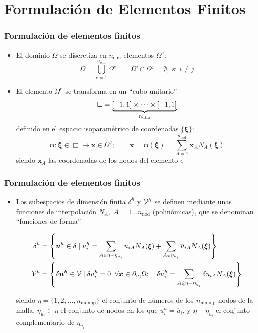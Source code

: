 \documentclass[handout]{beamer}
\begin{document}
\section{Formulación de Elementos Finitos}
\begin{frame}
\frametitle{Formulación de elementos finitos}
\begin{itemize}
\item El dominio $\Omega$ se discretiza en $n_{\textrm{elm}}$ elementos
$\Omega^e$:
\begin{equation}
\Omega=\bigcup_{e=1}^{n_{\textrm{elm}}} \Omega^e \qquad \Omega^i \cap \Omega^j=
\emptyset,\textrm{ si } i\neq j
\end{equation}
\item El elemento $\Omega^e$ se transforma
en un ``cubo unitario''
$$\Box=\underbrace{[-1,1]\times \cdots \times [-1,1]}_{n_{\rm dim}}$$
definido en el espacio isoparamétrico de coordenadas $\{ \bm{\xi} \}$:
\begin{equation}
\bm{\phi}:\bm{\xi}\in \Box \rightarrow \bm{x} \in \Omega^e; \qquad
\bm{x}=\bm{\phi}(\bm{\xi})=\sum_{A=1}^{n^{e}_{\textrm{nod}}}
\bm{x}_{A} N_{A}(\bm{\xi}) \label{mapiso}
\end{equation}
siendo $\bm{x}_A$ las coordenadas de los nodos
del elemento $e$
\end{itemize}
\end{frame}
\begin{frame}
\frametitle{Formulación de elementos finitos}
\begin{itemize}
\item Los subespacios de dimensión finita $\delta^h$ y ${\cal V}^h$
se definen mediante unas funciones de interpolación $N_A, \;
A=1 \ldots n_{\textrm{nod}}$ (polinómicas), que se denominan ``funciones de forma''
\begin{small}
\begin{align*}
\delta^h&=\left\{
\bm{u}^{h} \in \delta \mid
u_i^{h}=\sum_{A\in \eta - \eta_{u_i}} u_{iA}N_{A}(\bm{\xi})+
\sum_{A \in \eta_{u_i}} \overline{u}_{iA}N_{A}(\bm{\xi})
\right\}  \\
{\cal V}^{h}&=\left\{
\delta \bm{u}^{h} \in {\cal V} \mid \delta u_i^{h}=0 \;\;
\forall \bm{x} \in \partial_{u_i} \Omega ; \quad
\delta u_i^{h}=\sum_{A\in \eta - \eta_{u_i}}
\delta u_{iA}N_{A}(\bm{\xi})
\right\}
\end{align*}
\end{small}
siendo $\eta=\{ 1,2,\ldots,n_{\textrm{numnp}} \}$ el conjunto de números de los
$n_{\textrm{numnp}}$ nodos de la malla, $\eta_{u_i} \subset \eta$ el conjunto
de nodos en los que $u_i^h=\overline{u}_i$, y $\eta - \eta_{u_i}$ el conjunto
complementario de $\eta_{u_i}$
\end{itemize}
\end{frame}
\end{document}
